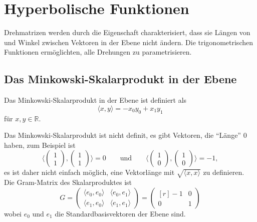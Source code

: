 %
%
%
\section{Hyperbolische Funktionen
\label{buch:geometrie:section:hyperbolisch}}
Drehmatrizen werden durch die Eigenschaft charakterisiert, dass
sie Längen von und Winkel zwischen Vektoren in der Ebene nicht
ändern.
Die trigonometrischen Funktionen ermöglichten, alle Drehungen
zu parametrisieren.

%
%
\subsection{Das Minkowski-Skalarprodukt in der Ebene}

\begin{definition}
Das Minkowski-Skalarprodukt in der Ebene ist definiert als
\[
\langle x,y\rangle
=
-x_0y_0+x_1y_1
\]
für $x,y\in\mathbb{R}$.
\end{definition}

Das Minkowski-Skalarprodukt ist nicht definit, es gibt Vektoren, die
``Länge''  $0$ haben, zum Beispiel ist 
\[
\biggl\langle
\begin{pmatrix}1\\1\end{pmatrix},
\begin{pmatrix}1\\1\end{pmatrix}
\biggr\rangle
=
0
\qquad\text{und}\qquad
\biggl\langle
\begin{pmatrix}1\\0\end{pmatrix},
\begin{pmatrix}1\\0\end{pmatrix}
\biggr\rangle
=
-1,
\]
es ist daher nicht einfach möglich, eine Vektorlänge mit
$\sqrt{\langle x,x\rangle}$ zu definieren.
Die Gram-Matrix des Skalarproduktes ist
\[
G
=
\begin{pmatrix}
\langle e_0,e_0\rangle& \langle e_0,e_1\rangle\\
\langle e_1,e_0\rangle& \langle e_1,e_1\rangle
\end{pmatrix}
=
\begin{pmatrix*}[r]
-1&0\\
 0&1
\end{pmatrix*} 
\]
wobei $e_0$ und $e_1$ die Standardbasisvektoren der Ebene sind.


